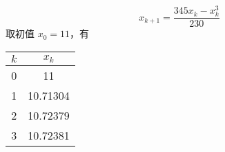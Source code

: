 \documentclass{sjtuarticle}
\begin{document}
\begin{itemize}
\begin{solution}
        \begin{equation*}
            x_{k+1}=\frac{345x_k-x_k^3}{230}
        \end{equation*}
        取初值 $x_0=11$，有
        \begin{table}[H]
            \centering
            \begin{tabular}{cc}
                \hline
                $k$ & $x_k$ \\
                \hline
                0 & 11 \\
                1 & 10.71304 \\
                2 & 10.72379 \\
                3 & 10.72381 \\
                \hline
            \end{tabular}
        \end{table}
        

\end{solution}
\end{itemize}
\end{document}
